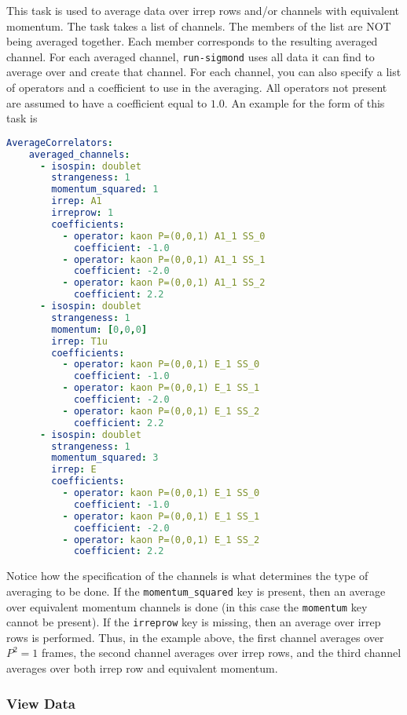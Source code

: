 \documentclass[12pt,letterpaper,notitlepage]{article}
\newcommand{\key}[1]{\textcolor{Emerald}{\texttt{\small{#1}}}}
\newcommand{\runsigmond}{\texttt{run-sigmond}}
\begin{document}
This task is used to average data over irrep rows and/or channels with equivalent momentum.
The task takes a list of channels.
The members of the list are NOT being averaged together.
Each member corresponds to the resulting averaged channel.
For each averaged channel, \runsigmond{} uses all data it can find to average over and create that channel.
For each channel, you can also specify a list of operators and a coefficient to use in the averaging.
All operators not present are assumed to have a coefficient equal to $1.0$.
An example for the form of this task is
\begin{lstlisting}[language=yaml]
  AverageCorrelators:
    averaged_channels:
      - isospin: doublet
        strangeness: 1
        momentum_squared: 1
        irrep: A1
        irreprow: 1
        coefficients:
          - operator: kaon P=(0,0,1) A1_1 SS_0
            coefficient: -1.0
          - operator: kaon P=(0,0,1) A1_1 SS_1
            coefficient: -2.0
          - operator: kaon P=(0,0,1) A1_1 SS_2
            coefficient: 2.2
      - isospin: doublet
        strangeness: 1
        momentum: [0,0,0]
        irrep: T1u
        coefficients:
          - operator: kaon P=(0,0,1) E_1 SS_0
            coefficient: -1.0
          - operator: kaon P=(0,0,1) E_1 SS_1
            coefficient: -2.0
          - operator: kaon P=(0,0,1) E_1 SS_2
            coefficient: 2.2
      - isospin: doublet
        strangeness: 1
        momentum_squared: 3
        irrep: E
        coefficients:
          - operator: kaon P=(0,0,1) E_1 SS_0
            coefficient: -1.0
          - operator: kaon P=(0,0,1) E_1 SS_1
            coefficient: -2.0
          - operator: kaon P=(0,0,1) E_1 SS_2
            coefficient: 2.2
\end{lstlisting}
Notice how the specification of the channels is what determines the type of averaging to be done.
If the \key{momentum\_squared} key is present, then an average over equivalent momentum channels is done (in this case the \key{momentum} key cannot be present).
If the \key{irreprow} key is missing, then an average over irrep rows is performed.
Thus, in the example above, the first channel averages over $P^2=1$ frames, the second channel averages over irrep rows, and the third channel averages over both
irrep row and equivalent momentum.

\subsubsection{View Data}
\end{document}
